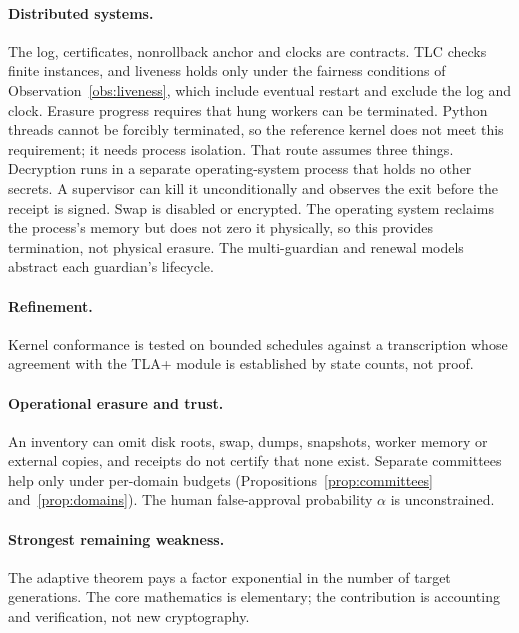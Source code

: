 \documentclass[pdflatex,sn-mathphys-num]{sn-jnl}
\theoremstyle{plain}
\theoremstyle{definition}
\begin{document}
\paragraph{Distributed systems.}
The log, certificates, nonrollback anchor and clocks are contracts. TLC checks finite instances, and liveness holds only under the fairness conditions of Observation~\ref{obs:liveness}, which include eventual restart and exclude the log and clock. Erasure progress requires that hung workers can be terminated. Python threads cannot be forcibly terminated, so the reference kernel does not meet this requirement; it needs process isolation. That route assumes three things. Decryption runs in a separate operating-system process that holds no other secrets. A supervisor can kill it unconditionally and observes the exit before the receipt is signed. Swap is disabled or encrypted. The operating system reclaims the process's memory but does not zero it physically, so this provides termination, not physical erasure. The multi-guardian and renewal models abstract each guardian's lifecycle.

\paragraph{Refinement.}
Kernel conformance is tested on bounded schedules against a transcription whose agreement with the TLA+ module is established by state counts, not proof.

\paragraph{Operational erasure and trust.}
An inventory can omit disk roots, swap, dumps, snapshots, worker memory or external copies, and receipts do not certify that none exist. Separate committees help only under per-domain budgets (Propositions~\ref{prop:committees} and~\ref{prop:domains}). The human false-approval probability $\alpha$ is unconstrained.

\paragraph{Strongest remaining weakness.}
The adaptive theorem pays a factor exponential in the number of target generations. The core mathematics is elementary; the contribution is accounting and verification, not new cryptography.
\end{document}
